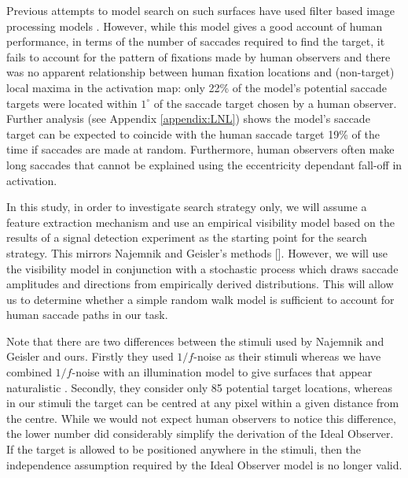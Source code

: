 Previous attempts to model search on such surfaces have used filter based image processing models \citep{clarke2009}. However, while this model gives a good account of human performance, in terms of the number of saccades required to find the target, it fails to account for the pattern of fixations made by human observers and there was no apparent relationship between human fixation locations and (non-target) local maxima in the activation map: only 22\% of the model's potential saccade targets were located within $1^{\circ}$ of the saccade target chosen by a human observer. Further analysis (see Appendix \ref{appendix:LNL}) shows the model's saccade target can be expected to coincide with the human saccade target 19\% of the time if saccades are made at random. Furthermore, human observers often make long saccades that cannot be explained using the eccentricity dependant fall-off in activation.
\par
In this study, in order to investigate search strategy only, we will assume a feature extraction mechanism and use an empirical visibility model based on the results of a signal detection experiment as the starting point for the search strategy. This mirrors Najemnik and Geisler's methods [\citeyear{najemnik-geisler2005}]. However, we will use the visibility model in conjunction with a stochastic process which draws saccade amplitudes and directions from empirically derived distributions. This will allow us to determine whether a simple random walk model is sufficient to account for human saccade paths in our task. 
\par
Note that there are two differences between the stimuli used by Najemnik and Geisler and ours. Firstly they used $1/f$-noise as their stimuli whereas we have combined $1/f$-noise with an illumination model to give surfaces that appear naturalistic \citep{clarke2008}. Secondly, they consider only 85 potential target locations, whereas in our stimuli the target can be centred at any pixel within a given distance from the centre. While we would not expect human observers to notice this difference, the lower number did considerably simplify the derivation of the Ideal Observer. If the target is allowed to be positioned anywhere in the stimuli, then the independence assumption required by the Ideal Observer model is no longer valid.
